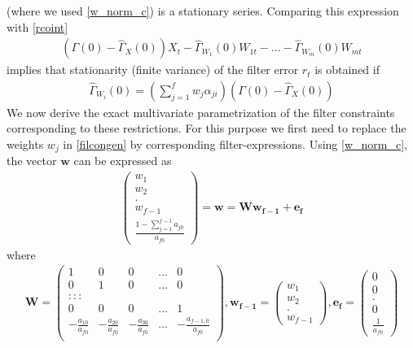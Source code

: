 \documentclass[11pt]{article}
\begin{document}
(where we used \ref{w_norm_c}) is a stationary series. Comparing this expression with \ref{rcoint}  
\begin{eqnarray*}
(\Gamma(0)-\hat{\Gamma}_X(0)){X}_t-\hat{\Gamma}_{W_1}(0){W}_{1t}-...-\hat{\Gamma}_{W_m}(0){W}_{mt}
\end{eqnarray*}
implies that stationarity (finite variance) of the filter error $r_t$ is obtained if 
\begin{eqnarray}\label{filcongen}
\hat{\Gamma}_{W_i}(0)=\left(\sum_{j=1}^fw_j\alpha_{ji}\right)(\Gamma(0)-\hat{\Gamma}_X(0))
\end{eqnarray}
We now derive the exact multivariate parametrization of the filter constraints corresponding to these restrictions. For this purpose we first need to replace the weights $w_j$ in \ref{filcongen} by corresponding filter-expressions. Using \ref{w_norm_c}, the vector $\mathbf{w}$ can be expressed as
\begin{eqnarray}\label{w_vec}
\left(\begin{array}{c}w_1\\w_2\\.\\w_{f-1}\\\frac{1-\sum_{j=1}^{f-1}a_{j0}}{a_{f0}}\end{array}\right)=\mathbf{w}=\mathbf{Ww_{f-1}+e_f}
\end{eqnarray}
where 
\begin{eqnarray*}
\mathbf{W}=\left(\begin{array}{ccccc}
1&0&0&...&0\\
0&1&0&...&0\\
:::\\
0&0&0&...&1\\
-\frac{a_{10}}{a_{f0}}&-\frac{a_{20}}{a_{f0}}&-\frac{a_{30}}{a_{f0}}&...&-\frac{a_{f-1,0}}{a_{f0}}\\
\end{array}\right),\mathbf{w_{f-1}}=\left(\begin{array}{c}w_1\\w_2\\.\\w_{f-1}\end{array}\right),\mathbf{e_f}=\left(\begin{array}{c}0\\0\\.\\0\\\frac{1}{a_{f0}}\end{array}\right)
\end{eqnarray*}
\end{document}
